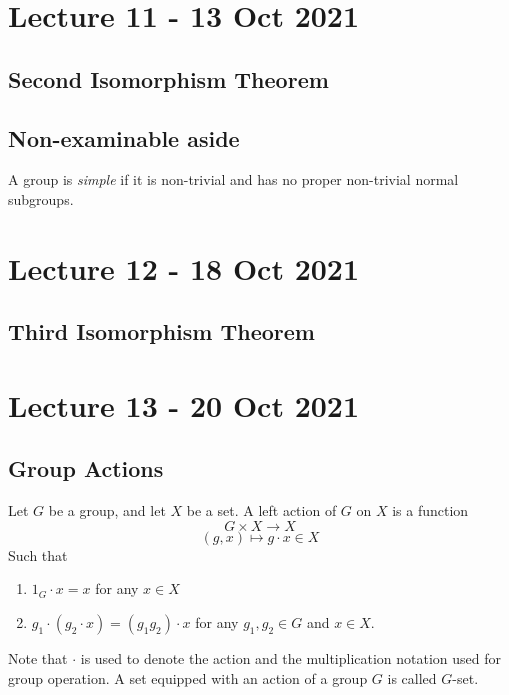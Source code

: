 \documentclass[11pt]{scrartcl}
\begin{document}
\section{Lecture 11 - 13 Oct 2021}

\subsection{Second Isomorphism Theorem}

\subsection{Non-examinable aside}

\begin{definition}
  A group is \emph{simple} if it is non-trivial and has no proper non-trivial normal
  subgroups.
\end{definition}

\section{Lecture 12 - 18 Oct 2021}

\subsection{Third Isomorphism Theorem}

\section{Lecture 13 - 20 Oct 2021}

\subsection{Group Actions}

\begin{definition} 
  Let $G$ be a group, and let $X$ be a set. A left action of $G$ on $X$ is a function
  \[G\times X \to X\]
  \[(g,x)\mapsto g\cdot x\in X\]
  Such that
  \begin{enumerate}
    \item $1_G \cdot x=x$ for any $x\in X$
    \item $g_1 \cdot (g_2\cdot x) = (g_1g_2)\cdot x$ for any $g_1,g_2\in G$ and $x\in X$.
  \end{enumerate}
  Note that $\cdot$ is used to denote the action and the multiplication notation used for
  group operation. A set equipped with an action of a group $G$ is called $G$-set.
  \label{def:leftAction}
\end{definition}
\end{document}
